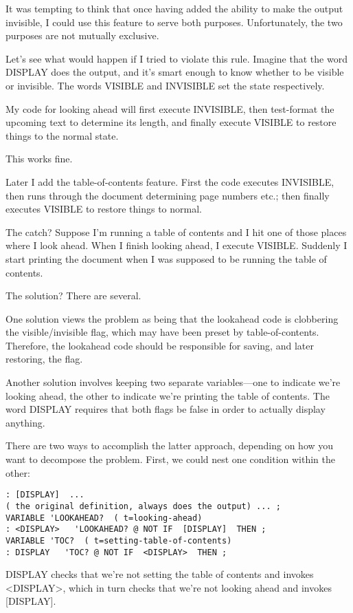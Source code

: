 It was tempting to think that once having added the ability to make
the output invisible, I could use this feature to serve both purposes.
Unfortunately, the two purposes are not mutually exclusive.

Let's see what would happen if I tried to violate this rule. Imagine
that the word DISPLAY does the output, and it's smart enough to know
whether to be visible or invisible. The words VISIBLE and INVISIBLE
set the state respectively.

My code for looking ahead will first execute INVISIBLE, then
test-format the upcoming text to determine its length, and finally execute
VISIBLE to restore things to the normal state.

This works fine.

Later I add the table-of-contents feature. First the code executes
INVISIBLE, then runs through the document determining page
numbers etc.; then finally executes VISIBLE to restore things to normal.

The catch? Suppose I'm running a table of contents and I hit one of
those places where I look ahead. When I finish looking ahead, I execute
VISIBLE. Suddenly I start printing the document when I was supposed
to be running the table of contents.

The solution? There are several.

One solution views the problem as being that the lookahead code is
clobbering the visible/invisible flag, which may have been preset by
table-of-contents. Therefore, the lookahead code should be responsible for
saving, and later restoring, the flag.

Another solution involves keeping two separate variables---one to
indicate we're looking ahead, the other to indicate we're printing the
table of contents. The word DISPLAY requires that both flags be false in
order to actually display anything.

There are two ways to accomplish the latter approach, depending on
how you want to decompose the problem. First, we could nest one condition
within the other:

\begin{verbatim}
: [DISPLAY]  ...
( the original definition, always does the output) ... ;
VARIABLE 'LOOKAHEAD?  ( t=looking-ahead)
: <DISPLAY>   'LOOKAHEAD? @ NOT IF  [DISPLAY]  THEN ;
VARIABLE 'TOC?  ( t=setting-table-of-contents)
: DISPLAY   'TOC? @ NOT IF  <DISPLAY>  THEN ;
\end{verbatim}

DISPLAY checks that we're not setting the table of contents and invokes
<DISPLAY>, which in turn checks that we're not looking ahead
and invokes [DISPLAY].

